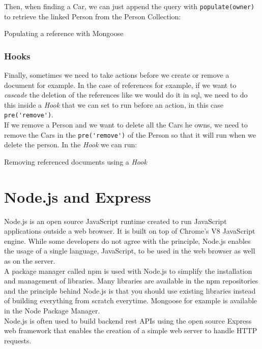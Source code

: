 \documentclass[twoside, openright,11pt,a4paper]{book}
\newenvironment{code}{\captionsetup{type=listing}}{}
\begin{document}
Then, when finding a Car, we can just append the query with \verb+populate(owner)+ to retrieve the linked Person from the Person Collection:
\begin{code}
	\caption{Populating a reference with Mongoose}
	\label{populating_mongo_code}
\end{code}
\subsubsection{Hooks}
\label{mongoose_hooks}
Finally, sometimes we need to take actions before we create or remove a document for example. In the case of references for example, if we want to \emph{cascade} the deletion of the references like we would do it in \gls{sql}, we need to do this inside a \emph{Hook} that we can set to run before an action, in this case \verb+pre('remove')+.\\

If we remove a Person and we want to delete all the Cars he owns, we need to remove the Cars in the \verb+pre('remove')+ of the Person so that it will run when we delete the person. In the \emph{Hook} we can run:
\begin{code}
	\caption{Removing referenced documents using a \emph{Hook}}
\end{code}
\section{Node.js and Express}
\label{node}
Node.js\cite{node:website}\cite{github:node} is an open source JavaScript runtime created to run JavaScript applications outside a web browser. It is built on top of Chrome's V8 JavaScript engine. While some developers do not agree with the principle, Node.js enables the usage of a single language, JavaScript, to be used in the web browser as well as on the server. \\

A package manager called \gls{npm}\cite{npm:website} is used with Node.js to simplify the installation and management of libraries.   Many libraries are available in the \gls{npm} repositories and the principle behind Node.js is that you should use existing libraries instead of building everything from scratch everytime. Mongoose for example is available in the Node Package Manager. \\

Node.js is often used to build backend \gls{rest} APIs using the open source Express\cite{express:website}\cite{github:express} web framework that enables the creation of a simple web server to handle HTTP requests.
\end{document}

